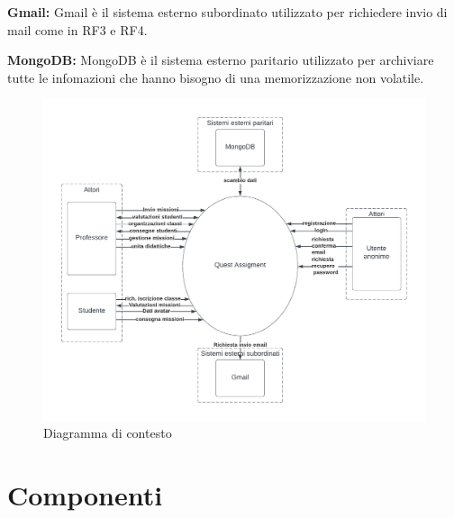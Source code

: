 \textbf{Gmail: }Gmail è il sistema esterno subordinato utilizzato per richiedere invio di mail come in RF3 e RF4.

\textbf{MongoDB:} MongoDB è il sistema esterno paritario utilizzato per archiviare tutte le infomazioni che hanno bisogno di una memorizzazione non volatile.

\begin{figure}[h!]
  \centerline{\includegraphics[trim={1cm 1cm 1cm 1cm},clip,height = 9 cm, width= 13 cm]{figures/contesto.pdf}}
  \caption{Diagramma di contesto}
\end{figure}

\section{Componenti}


